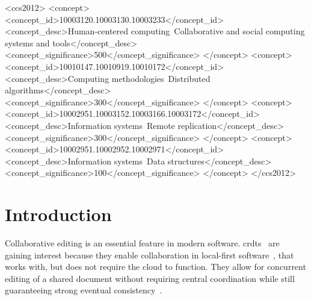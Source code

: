 \documentclass[sigplan,10pt]{acmart}
\begin{document}
\begin{CCSXML}
<ccs2012>
   <concept>
       <concept_id>10003120.10003130.10003233</concept_id>
       <concept_desc>Human-centered computing~Collaborative and social computing systems and tools</concept_desc>
       <concept_significance>500</concept_significance>
       </concept>
   <concept>
       <concept_id>10010147.10010919.10010172</concept_id>
       <concept_desc>Computing methodologies~Distributed algorithms</concept_desc>
       <concept_significance>300</concept_significance>
       </concept>
   <concept>
       <concept_id>10002951.10003152.10003166.10003172</concept_id>
       <concept_desc>Information systems~Remote replication</concept_desc>
       <concept_significance>300</concept_significance>
       </concept>
   <concept>
       <concept_id>10002951.10002952.10002971</concept_id>
       <concept_desc>Information systems~Data structures</concept_desc>
       <concept_significance>100</concept_significance>
       </concept>
 </ccs2012>
\end{CCSXML}




\maketitle

\section{Introduction}\label{sec:introduction}

Collaborative editing is an essential feature in modern software.
\glspl*{crdt}~\cite{preguicca2018conflict} are gaining interest because they
enable collaboration in local-first software~\cite{kleppmann2019local},
that works with, but does not require the cloud to function.
They allow for concurrent editing of a shared document without requiring
central coordination while still guaranteeing strong eventual
consistency~\cite{shapiro2011comprehensive}.
\end{document}
